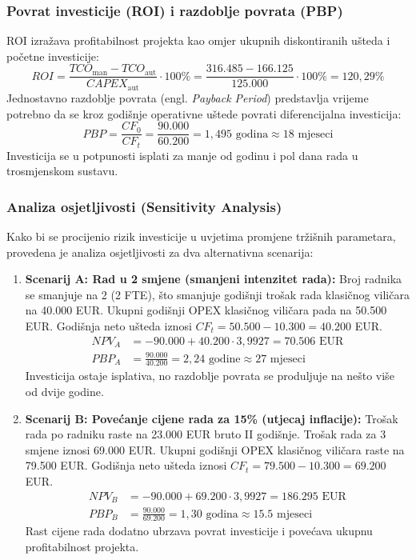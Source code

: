 \subsubsection{Povrat investicije (ROI) i razdoblje povrata (PBP)}
ROI izražava profitabilnost projekta kao omjer ukupnih diskontiranih ušteda i početne investicije:
\begin{equation}
    ROI = \frac{TCO_{\text{man}} - TCO_{\text{aut}}}{CAPEX_{\text{aut}}} \cdot 100\% = \frac{316.485 - 166.125}{125.000} \cdot 100\% = 120,29\%
\end{equation}
Jednostavno razdoblje povrata (engl. \textit{Payback Period}) predstavlja vrijeme potrebno da se kroz godišnje operativne uštede povrati diferencijalna investicija:
\begin{equation}
    PBP = \frac{CF_0}{CF_t} = \frac{90.000}{60.200} = 1,495\text{ godina} \approx 18\text{ mjeseci}
\end{equation}
Investicija se u potpunosti isplati za manje od godinu i pol dana rada u trosmjenskom sustavu.

\subsubsection{Analiza osjetljivosti (Sensitivity Analysis)}
Kako bi se procijenio rizik investicije u uvjetima promjene tržišnih parametara, provedena je analiza osjetljivosti za dva alternativna scenarija:
\begin{enumerate}
    \item \textbf{Scenarij A: Rad u 2 smjene (smanjeni intenzitet rada):}
    Broj radnika se smanjuje na 2 (2 FTE), što smanjuje godišnji trošak rada klasičnog viličara na 40.000 EUR. Ukupni godišnji OPEX klasičnog viličara pada na 50.500 EUR. Godišnja neto ušteda iznosi $CF_t = 50.500 - 10.300 = 40.200$ EUR.
    \begin{align*}
        NPV_A &= -90.000 + 40.200 \cdot 3,9927 = 70.506\text{ EUR} \\
        PBP_A &= \frac{90.000}{40.200} = 2,24\text{ godine} \approx 27\text{ mjeseci}
    \end{align*}
    Investicija ostaje isplativa, no razdoblje povrata se produljuje na nešto više od dvije godine.
    \item \textbf{Scenarij B: Povećanje cijene rada za 15\% (utjecaj inflacije):}
    Trošak rada po radniku raste na 23.000 EUR bruto II godišnje. Trošak rada za 3 smjene iznosi 69.000 EUR. Ukupni godišnji OPEX klasičnog viličara raste na 79.500 EUR. Godišnja neto ušteda iznosi $CF_t = 79.500 - 10.300 = 69.200$ EUR.
    \begin{align*}
        NPV_B &= -90.000 + 69.200 \cdot 3,9927 = 186.295\text{ EUR} \\
        PBP_B &= \frac{90.000}{69.200} = 1,30\text{ godina} \approx 15.5\text{ mjeseci}
    \end{align*}
    Rast cijene rada dodatno ubrzava povrat investicije i povećava ukupnu profitabilnost projekta.
\end{enumerate}

